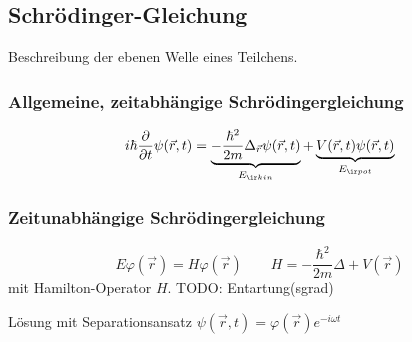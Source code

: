 \subsection{Schrödinger-Gleichung}
Beschreibung der ebenen Welle eines Teilchens.
\begin{sectionbox}
    \begin{emphbox}
        \subsubsection{Allgemeine, zeitabhängige Schrödingergleichung}
        \begin{equation*}
            i\hbar \frac{\partial}{\partial t}\psi(\vec r, t) = \underbrace{-\frac{\hbar^2}{2m}\Delta_{\vec r}\psi(\vec r, t)}_{E_{\ir kin}} + \underbrace{V(\vec r, t)\psi(\vec r, t)}_{E_{\ir pot}}
        \end{equation*}
    \end{emphbox}

    \begin{emphbox}
        \subsubsection{Zeitunabhängige Schrödingergleichung}
        \begin{equation*}
            E\varphi(\vec r) = H\varphi(\vec r) \qquad H=-\frac{\hbar^2}{2m}\Delta + V(\vec r)
        \end{equation*}
        mit Hamilton-Operator $H$.
        TODO: Entartung(sgrad)
    \end{emphbox}

    Lösung mit Separationsansatz $\psi(\vec r, t) = \varphi(\vec r)e^{-i\omega t}$
\end{sectionbox}

